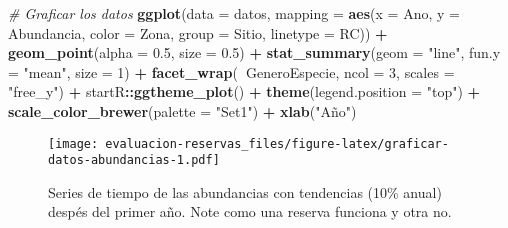 \documentclass[]{krantz}
\newenvironment{Shaded}{\begin{snugshade}}{\end{snugshade}}
\newcommand{\CommentTok}[1]{\textcolor[rgb]{0.56,0.35,0.01}{\textit{#1}}}
\newcommand{\DataTypeTok}[1]{\textcolor[rgb]{0.13,0.29,0.53}{#1}}
\newcommand{\DecValTok}[1]{\textcolor[rgb]{0.00,0.00,0.81}{#1}}
\newcommand{\FloatTok}[1]{\textcolor[rgb]{0.00,0.00,0.81}{#1}}
\newcommand{\KeywordTok}[1]{\textcolor[rgb]{0.13,0.29,0.53}{\textbf{#1}}}
\newcommand{\NormalTok}[1]{#1}
\newcommand{\OperatorTok}[1]{\textcolor[rgb]{0.81,0.36,0.00}{\textbf{#1}}}
\newcommand{\StringTok}[1]{\textcolor[rgb]{0.31,0.60,0.02}{#1}}
\begin{document}
\begin{Shaded}
\begin{Highlighting}[]
\CommentTok{# Graficar los datos}
\KeywordTok{ggplot}\NormalTok{(}\DataTypeTok{data =}\NormalTok{ datos,}
       \DataTypeTok{mapping =} \KeywordTok{aes}\NormalTok{(}\DataTypeTok{x =}\NormalTok{ Ano, }\DataTypeTok{y =}\NormalTok{ Abundancia,}
                     \DataTypeTok{color =}\NormalTok{ Zona, }\DataTypeTok{group =}\NormalTok{ Sitio, }\DataTypeTok{linetype =}\NormalTok{ RC)) }\OperatorTok{+}
\StringTok{  }\KeywordTok{geom_point}\NormalTok{(}\DataTypeTok{alpha =} \FloatTok{0.5}\NormalTok{, }\DataTypeTok{size =} \FloatTok{0.5}\NormalTok{) }\OperatorTok{+}
\StringTok{  }\KeywordTok{stat_summary}\NormalTok{(}\DataTypeTok{geom =} \StringTok{"line"}\NormalTok{, }\DataTypeTok{fun.y =} \StringTok{"mean"}\NormalTok{, }\DataTypeTok{size =} \DecValTok{1}\NormalTok{) }\OperatorTok{+}
\StringTok{  }\KeywordTok{facet_wrap}\NormalTok{(}\OperatorTok{~}\NormalTok{GeneroEspecie, }\DataTypeTok{ncol =} \DecValTok{3}\NormalTok{, }\DataTypeTok{scales =} \StringTok{"free_y"}\NormalTok{) }\OperatorTok{+}
\StringTok{  }\NormalTok{startR}\OperatorTok{::}\KeywordTok{ggtheme_plot}\NormalTok{() }\OperatorTok{+}
\StringTok{  }\KeywordTok{theme}\NormalTok{(}\DataTypeTok{legend.position =} \StringTok{"top"}\NormalTok{) }\OperatorTok{+}
\StringTok{  }\KeywordTok{scale_color_brewer}\NormalTok{(}\DataTypeTok{palette =} \StringTok{"Set1"}\NormalTok{) }\OperatorTok{+}
\StringTok{  }\KeywordTok{xlab}\NormalTok{(}\StringTok{"Año"}\NormalTok{)}
\end{Highlighting}
\end{Shaded}

\begin{figure}
\centering
\texttt{[image: evaluacion-reservas\_files/figure-latex/graficar-datos-abundancias-1.pdf]}
\caption{\label{fig:graficar-datos-abundancias}Series de tiempo de las
abundancias con tendencias (10\% anual) despés del primer año. Note como
una reserva funciona y otra no.}
\end{figure}
\end{document}
